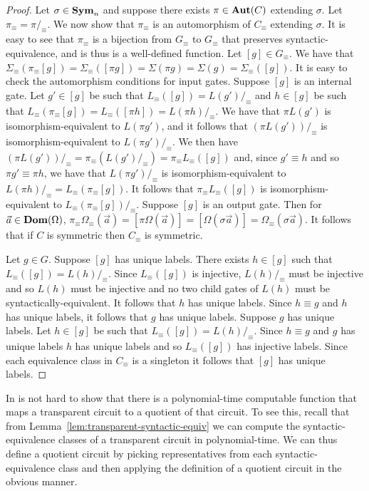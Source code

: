 \documentclass[../paper.tex]{subfiles}
\begin{document}
\begin{proof}
  Let $\sigma \in \text{\textbf{Sym}}_n$ and suppose there exists $\pi \in \text{\textbf{Aut}}(C)$ extending
  $\sigma$. Let $\pi_\equiv = \pi /_\equiv$. We now show that $\pi_\equiv$ is an
  automorphism of $C_\equiv$ extending $\sigma$. It is easy to see that
  $\pi_\equiv$ is a bijection from $G_\equiv$ to $G_\equiv$ that preserves
  syntactic-equivalence, and is thus is a well-defined function. Let $[g] \in
  G_\equiv$. We have that $\Sigma_\equiv (\pi_\equiv [g]) = \Sigma_\equiv ([\pi
  g]) = \Sigma (\pi g) = \Sigma (g) = \Sigma_\equiv ([g])$. It is easy to check
  the automorphism conditions for input gates. Suppose $[g]$ is an internal
  gate. Let $g' \in [g]$ be such that $L_\equiv([g]) = L(g') /_\equiv$ and $h
  \in [g]$ be such that $L_\equiv(\pi_\equiv[g]) = L_\equiv ([\pi h]) = L(\pi h)
  /_\equiv$. We have that $\pi L(g')$ is isomorphism-equivalent to $L(\pi g')$,
  and it follows that $(\pi L(g'))/_\equiv$ is isomorphism-equivalent to $L(\pi
  g') /_\equiv$. We then have $(\pi L(g'))/_\equiv = \pi_\equiv (L(g') /_\equiv)
  = \pi_\equiv L_\equiv ([g])$ and, since $g' \equiv h$ and so $\pi g' \equiv
  \pi h$, we have that $L(\pi g')/_\equiv$ is isomorphism-equivalent to $L(\pi
  h) /_\equiv = L_\equiv(\pi_\equiv[g])$. It follows that $\pi_\equiv L_\equiv
  ([g])$ is isomorphism-equivalent to $L_\equiv(\pi_\equiv [g]) /_\equiv$.
  Suppose $[g]$ is an output gate. Then for $\vec{a} \in \text{\textbf{Dom}} (\Omega)$,
  $\pi_\equiv \Omega_\equiv (\vec{a}) = [\pi \Omega (\vec{a})] = [\Omega (\sigma
  \vec{a})] = \Omega_\equiv (\sigma \vec{a})$. It follows that if $C$ is
  symmetric then $C_\equiv$ is symmetric.

  Let $g \in G$. Suppose $[g]$ has unique labels. There exists $h \in [g]$ such
  that $L_\equiv([g]) = L(h) /_\equiv$. Since $L_\equiv([g])$ is injective,
  $L(h) /_\equiv$ must be injective and so $L(h)$ must be injective and no two
  child gates of $L(h)$ must be syntactically-equivalent. It follows that $h$
  has unique labels. Since $h \equiv g$ and $h$ has unique labels, it follows
  that $g$ has unique labels. Suppose $g$ has unique labels. Let $h \in [g]$ be
  such that $L_\equiv([g]) = L(h) /_\equiv$. Since $h \equiv g$ and $g$ has
  unique labels $h$ has unique labels and so $L_\equiv([g])$ has injective
  labels. Since each equivalence class in $C_\equiv$ is a singleton it follows
  that $[g]$ has unique labels.
\end{proof}

In is not hard to show that there is a polynomial-time computable function that
maps a transparent circuit to a quotient of that circuit. To see this, recall
that from Lemma~\ref{lem:transparent-syntactic-equiv} we can compute the
syntactic-equivalence classes of a transparent circuit in polynomial-time. We
can thus define a quotient circuit by picking representatives from each
syntactic-equivalence class and then applying the definition of a quotient
circuit in the obvious manner.
\end{document}

